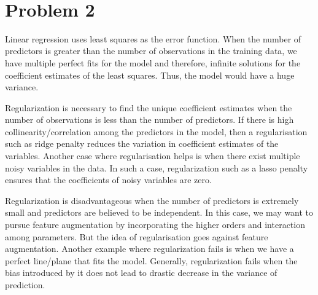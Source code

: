 \documentclass[11pt]{article}
\begin{document}
\begin{center}

\ \\
\end{center}

\section*{Problem 2}

\vspace{5 mm}
\noindent
Linear regression uses least squares as the error function. When the number of predictors is
greater than the number of observations in the training data, we have multiple perfect fits for the
model and therefore, infinite solutions for the coefficient estimates of the least squares. Thus, the model
would have a huge variance.

Regularization is necessary to find the unique coefficient estimates when the number of observations
is less than the number of predictors. If there is high collinearity/correlation among the predictors in the model,
then a regularisation such as ridge penalty reduces the variation in coefficient estimates of the variables.
Another case where regularisation helps is when there exist multiple noisy variables in the data. In such a case, 
regularization such as a lasso penalty ensures that the coefficients of noisy variables are zero.

Regularization is disadvantageous when the number of predictors is extremely small and predictors are
believed to be  independent. In this case, we may want to pursue feature augmentation by 
incorporating the higher orders and interaction among parameters. But the idea of regularisation
goes against feature augmentation. Another example where regularization fails is when we have
a perfect line/plane that fits the model. Generally, regularization fails when the bias introduced
by it does not lead to drastic decrease in the variance of prediction. 
\end{document}
